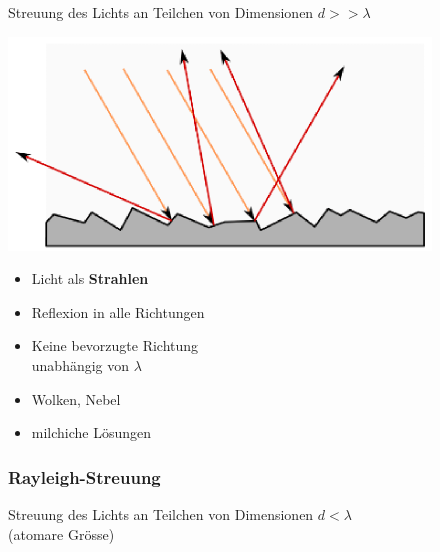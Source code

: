 Streuung des Lichts an Teilchen von Dimensionen $d >> \lambda$ \\ 

\begin{minipage}{0.45\linewidth}
\includegraphics[width=\linewidth]{Bilder/Wellen-Optik/diffuse_streuung}
\end{minipage}
\hfill
\begin{minipage}{0.53\linewidth}

\begin{itemize}

\item Licht als \textbf{Strahlen}
\item Reflexion in alle Richtungen
\item Keine bevorzugte Richtung \\
	 unabhängig von $\lambda$ 
\item Wolken, Nebel 
\item milchiche Lösungen 	  

\end{itemize}

\end{minipage}




\subsubsection{Rayleigh-Streuung}

Streuung des Lichts an Teilchen von Dimensionen $d < \lambda$ \\
(atomare Grösse) \\ 

